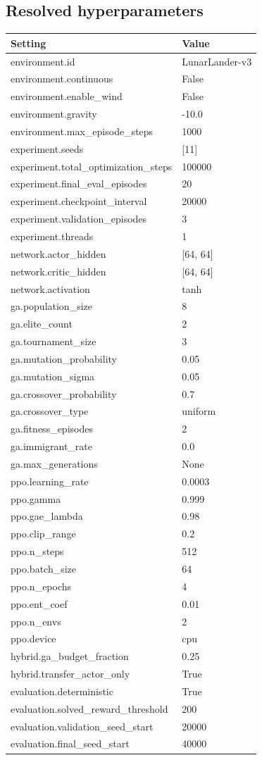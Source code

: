 \documentclass[11pt,a4paper]{article}
\begin{document}
\subsection*{Resolved hyperparameters}
\begingroup\small
\begin{longtable}{p{}p{}}
\toprule
Setting & Value \\
\midrule\endhead
environment.id & LunarLander-v3 \\
environment.continuous & False \\
environment.enable\_wind & False \\
environment.gravity & -10.0 \\
environment.max\_episode\_steps & 1000 \\
experiment.seeds & [11] \\
experiment.total\_optimization\_steps & 100000 \\
experiment.final\_eval\_episodes & 20 \\
experiment.checkpoint\_interval & 20000 \\
experiment.validation\_episodes & 3 \\
experiment.threads & 1 \\
network.actor\_hidden & [64, 64] \\
network.critic\_hidden & [64, 64] \\
network.activation & tanh \\
ga.population\_size & 8 \\
ga.elite\_count & 2 \\
ga.tournament\_size & 3 \\
ga.mutation\_probability & 0.05 \\
ga.mutation\_sigma & 0.05 \\
ga.crossover\_probability & 0.7 \\
ga.crossover\_type & uniform \\
ga.fitness\_episodes & 2 \\
ga.immigrant\_rate & 0.0 \\
ga.max\_generations & None \\
ppo.learning\_rate & 0.0003 \\
ppo.gamma & 0.999 \\
ppo.gae\_lambda & 0.98 \\
ppo.clip\_range & 0.2 \\
ppo.n\_steps & 512 \\
ppo.batch\_size & 64 \\
ppo.n\_epochs & 4 \\
ppo.ent\_coef & 0.01 \\
ppo.n\_envs & 2 \\
ppo.device & cpu \\
hybrid.ga\_budget\_fraction & 0.25 \\
hybrid.transfer\_actor\_only & True \\
evaluation.deterministic & True \\
evaluation.solved\_reward\_threshold & 200 \\
evaluation.validation\_seed\_start & 20000 \\
evaluation.final\_seed\_start & 40000 \\
\bottomrule\end{longtable}
\end{document}
